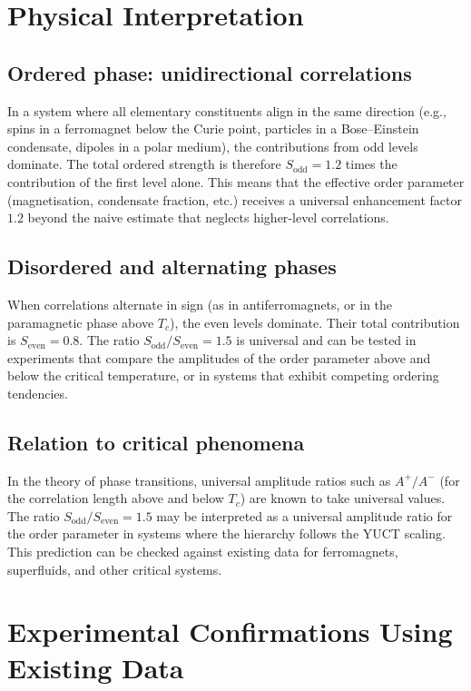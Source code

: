 \documentclass[12pt,a4paper]{article}
\begin{document}
	\section{Physical Interpretation}
	
	\subsection{Ordered phase: unidirectional correlations}
	In a system where all elementary constituents align in the same direction (e.g., spins in a ferromagnet below the Curie point, particles in a Bose–Einstein condensate, dipoles in a polar medium), the contributions from odd levels dominate. The total ordered strength is therefore \(S_{\text{odd}} = 1.2\) times the contribution of the first level alone. This means that the effective order parameter (magnetisation, condensate fraction, etc.) receives a universal enhancement factor \(1.2\) beyond the naive estimate that neglects higher‑level correlations.
	
	\subsection{Disordered and alternating phases}
	When correlations alternate in sign (as in antiferromagnets, or in the paramagnetic phase above \(T_c\)), the even levels dominate. Their total contribution is \(S_{\text{even}} = 0.8\). The ratio \(S_{\text{odd}}/S_{\text{even}} = 1.5\) is universal and can be tested in experiments that compare the amplitudes of the order parameter above and below the critical temperature, or in systems that exhibit competing ordering tendencies.
	
	\subsection{Relation to critical phenomena}
	In the theory of phase transitions, universal amplitude ratios such as \(A^+/A^-\) (for the correlation length above and below \(T_c\)) are known to take universal values. The ratio \(S_{\text{odd}}/S_{\text{even}} = 1.5\) may be interpreted as a universal amplitude ratio for the order parameter in systems where the hierarchy follows the YUCT scaling. This prediction can be checked against existing data for ferromagnets, superfluids, and other critical systems.
	
	\section{Experimental Confirmations Using Existing Data}
	
\end{document}
